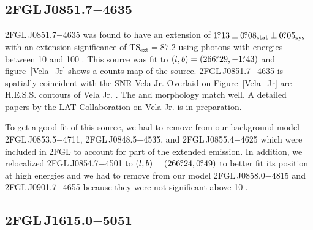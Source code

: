 \documentclass[12pt,preprint]{aastex}
\newcommand{\gev}{\text{GeV}\xspace}
\newcommand{\tev}{\text{TeV}\xspace}
\newcommand{\tsext}{{\ensuremath{\text{TS}_{\text{ext}}}}\xspace}
\newcommand{\sys}{\text{sys}\xspace}
\newcommand{\stat}{\text{stat}\xspace}
\begin{document}
\subsection{2FGL\,J0851.7$-$4635}
\label{section_2FGL_J0851.7-4635}


2FGL\,J0851.7$-$4635 was found 
to have an
extension of $1\fdg13\pm0\fdg08_\stat\pm0\fdg05_\sys$ 
with an extension
significance of $\tsext=87.2$
using photons with energies between 10 \gev and 100 \gev.  
This source was fit to 
$(l,b)=(266\mbox{$.\!\!^\circ$}29,-1\mbox{$.\!\!^\circ$}43)$ and figure~\ref{Vela_Jr} shows a counts
map of the source.
2FGL\,J0851.7$-$4635 is spatially coincident with the SNR Vela Jr.
Overlaid on Figure~\ref{Vela_Jr} are H.E.S.S. \tev contours of Vela Jr.
\citep{vela_jr_hess}.  The \gev and \tev morphology
match well.  A detailed papers by the LAT Collaboration on Vela Jr. is
in preparation.

To get a good fit of this source, we had to remove from
our background model 
2FGL\,J0853.5$-$4711, 2FGL\,J0848.5$-$4535, and 2FGL\,J0855.4$-$4625
which were included in 2FGL to account for part of the extended emission.  In addition, we relocalized
2FGL\,J0854.7$-$4501 to
$(l,b)=(266\mbox{$.\!\!^\circ$}24,0\mbox{$.\!\!^\circ$}49)$ to better fit its position at high energies
and we had to remove from our model 2FGL\,J0858.0$-$4815 and 2FGL\,J0901.7$-$4655
because they were not significant above 10 \gev.  

\subsection{2FGL\,J1615.0$-$5051}
\label{section_2FGL_J1615.0-5051}

\end{document}
